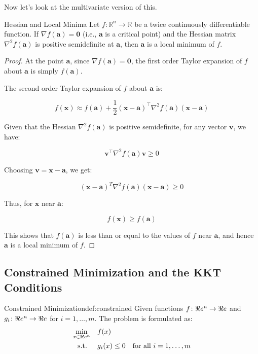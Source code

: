 Now let's look at the multivariate version of this.


\begin{lemma}{Hessian and Local Minima}{}
Let \( f\colon \mathbb{R}^n \rightarrow \mathbb{R} \) be a twice continuously differentiable function. If \( \nabla f(\mathbf{a}) = \mathbf{0} \) (i.e., \( \mathbf{a} \) is a critical point) and the Hessian matrix \( \nabla^2 f(\mathbf{a}) \) is positive semidefinite at \( \mathbf{a} \), then \( \mathbf{a} \) is a local minimum of \( f \).
\end{lemma}

\begin{proof}
At the point \( \mathbf{a} \), since \( \nabla f(\mathbf{a}) = \mathbf{0} \), the first order Taylor expansion of \( f \) about \( \mathbf{a} \) is simply \( f(\mathbf{a}) \).

The second order Taylor expansion of \( f \) about \( \mathbf{a} \) is:

\[
f(\mathbf{x}) \approx f(\mathbf{a}) + \frac{1}{2} (\mathbf{x}-\mathbf{a})^\top \nabla^2 f(\mathbf{a}) (\mathbf{x}-\mathbf{a})
\]

Given that the Hessian \( \nabla^2 f(\mathbf{a}) \) is positive semidefinite, for any vector \( \mathbf{v} \), we have:

\[
\mathbf{v}^\top \nabla^2 f(\mathbf{a}) \mathbf{v} \geq 0
\]

Choosing \( \mathbf{v} = \mathbf{x}-\mathbf{a} \), we get:

\[
(\mathbf{x}-\mathbf{a})^T \nabla^2 f(\mathbf{a}) (\mathbf{x}-\mathbf{a}) \geq 0
\]

Thus, for \( \mathbf{x} \) near \( \mathbf{a} \):

\[
f(\mathbf{x}) \geq f(\mathbf{a})
\]

This shows that \( f(\mathbf{a}) \) is less than or equal to the values of \( f \) near \( \mathbf{a} \), and hence \( \mathbf{a} \) is a local minimum of \( f \).
\end{proof}



\subsection{Constrained Minimization and the KKT Conditions}

 \begin{definition}{Constrained Minimization}{def:constrained}
        Given functions $f\colon \Re e^n \to \Re e$ and $g_i\colon \Re e^n \to \Re e$ for $i = 1, \dots, m$. The problem is formulated as:
        \begin{align*}
        \min_{x \in \Re e^n} \quad & f(x) \\
        \mbox{ s.t. } \quad & g_i(x) \leq 0 & \mbox{for all } i=1, \dots, m
        \end{align*}
    \end{definition}
    

